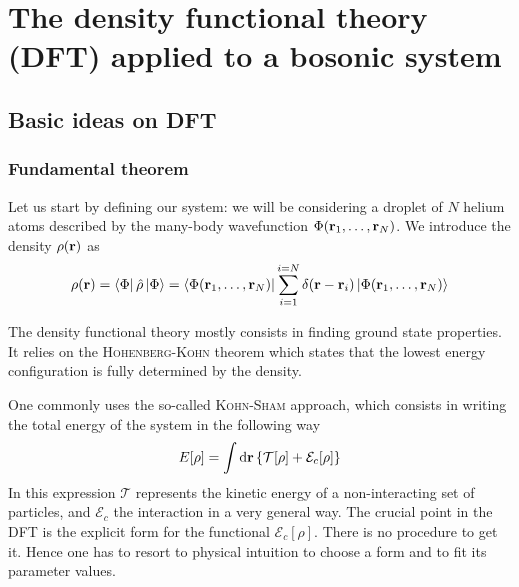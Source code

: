 
\section{The density functional theory (DFT) applied to a bosonic system}

\subsection{Basic ideas on DFT}

\subsubsection{Fundamental theorem}

Let us start by defining our system: we will be considering a droplet of $N$ helium atoms described by the many-body wavefunction $\Phi(\vb{r}_1, \ldots, \vb{r}_N)$.
We introduce the density $\rho(\vb{r})$ as
\begin{align}\label{eq:DFT-rhodef}
\rho(\vb{r}) = \bra{\Phi} \hat{\rho} \ket{\Phi} = \bra{\Phi(\vb{r}_1, \ldots, \vb{r}_N)} \sum_{i=1}^{i=N} \delta(\vb{r}-\vb{r}_i) \ket{\Phi(\vb{r}_1, \ldots, \vb{r}_N)}
\end{align}

The density functional theory mostly consists in finding ground state properties.
It relies on the \textsc{Hohenberg-Kohn} theorem \cite{Hoh1964} which states that the lowest energy configuration is fully determined by the density.


One commonly uses the so-called \textsc{Kohn-Sham} approach, which consists in writing the total energy of the system in the following way
\begin{align}\label{eq:DFT-EKS}%
E[\rho]=\int \dd{\vb{r}} \{\mathcal{T}[\rho] + \mathcal{E}_c[\rho]\}
\end{align}
In this expression $\mathcal{T}$ represents the kinetic energy of a non-interacting set of particles, and $\mathcal{E}_c$ the interaction in a very general way. The crucial point in the DFT is the explicit form for the functional $\mathcal{E}_c[\rho]$. There is no procedure to get it. Hence one has to resort to physical intuition to choose a form and to fit its parameter values.

